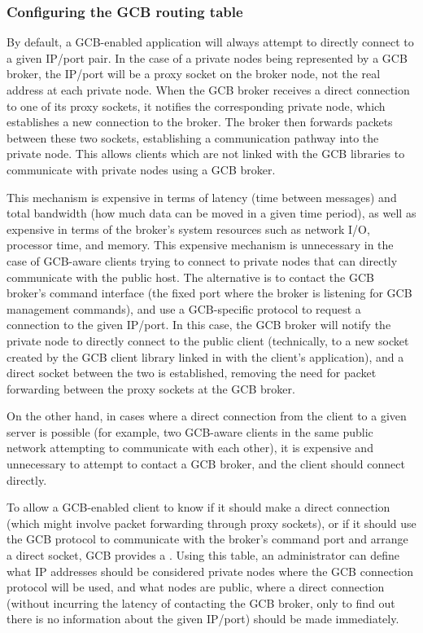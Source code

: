\subsubsection{\label{sec:GCB-routing-table}Configuring the GCB
  routing table} 

By default, a GCB-enabled application will always attempt to directly
connect to a given IP/port pair.
In the case of a private nodes being represented by a GCB broker, the
IP/port will be a proxy socket on the broker node, not the real
address at each private node.
When the GCB broker receives a direct connection to one of its proxy 
sockets, it notifies the corresponding private node, which
establishes a new connection to the broker.
The broker then forwards packets between these two sockets,
establishing a communication pathway into the private node.
This allows clients which are not linked with the GCB libraries to communicate
with private nodes using a GCB broker.

This mechanism is expensive
in terms of latency (time between messages) and total bandwidth
(how much data can be moved in a given time period),
as well as expensive in terms of the broker's
system resources such as network I/O, processor time, and memory.
This expensive mechanism is 
unnecessary in the case of
GCB-aware clients trying to connect to private nodes that can directly
communicate with the public host.
The alternative is to contact the GCB broker's command interface (the
fixed port where the broker is listening for GCB management commands),
and use
a GCB-specific protocol to request a connection to the given IP/port.
In this case, the GCB broker will notify the private node to directly
connect to the public client (technically, to a new socket created by
the GCB client library linked in with the client's application), and a
direct socket between the two is established, removing the need for
packet forwarding between the proxy sockets at the GCB broker.

On the other hand, in cases where a direct connection from the client
to a given server is possible
(for example, two GCB-aware clients in the same
public network attempting to communicate with each other),
it is
expensive and unnecessary to attempt to contact a GCB broker, and the
client should connect directly.

To allow a GCB-enabled client to know if it should make a direct
connection (which might involve packet forwarding through proxy
sockets), or if it should use the GCB protocol to communicate with the
broker's command port and arrange a direct socket,
GCB provides a .
Using this table, an administrator can define what IP addresses should
be considered private nodes where the GCB connection protocol will be
used, and what nodes are public, where a direct connection (without
incurring the latency of contacting the GCB broker, only to find out
there is no information about the given IP/port) should be made
immediately. 

